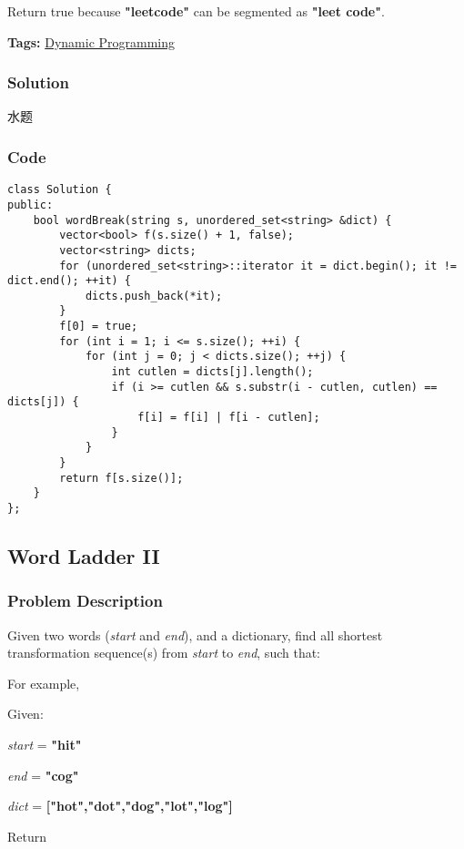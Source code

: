 \documentclass{article}
\begin{document}
\begin{CJK*}{UTF8}{gkai}
Return true because \textbf{"leetcode"} can be segmented as \textbf{"leet code"}.


\textbf{Tags: }
\hyperref[ Dynamic Programming ]{ Dynamic Programming }



\subsubsection*{Solution}
水题

\subsubsection*{Code}
\begin{lstlisting}
class Solution {
public:
    bool wordBreak(string s, unordered_set<string> &dict) {
        vector<bool> f(s.size() + 1, false);
        vector<string> dicts;
        for (unordered_set<string>::iterator it = dict.begin(); it != dict.end(); ++it) {
            dicts.push_back(*it);
        }
        f[0] = true;
        for (int i = 1; i <= s.size(); ++i) {
            for (int j = 0; j < dicts.size(); ++j) {
                int cutlen = dicts[j].length();
                if (i >= cutlen && s.substr(i - cutlen, cutlen) == dicts[j]) {
                    f[i] = f[i] | f[i - cutlen];
                }
            }
        }
        return f[s.size()];
    }
}; 
\end{lstlisting}


\subsection{ Word Ladder II }
\label{ Word Ladder II }

\subsubsection*{Problem Description}
Given two words (\emph{start} and \emph{end}), and a dictionary, find all shortest transformation sequence(s) from \emph{start} to \emph{end}, such that:

For example,

Given:


\emph{start} = \textbf{"hit"}


\emph{end} = \textbf{"cog"}


\emph{dict} = \textbf{["hot","dot","dog","lot","log"]}

Return



\end{CJK*}
\end{document}
